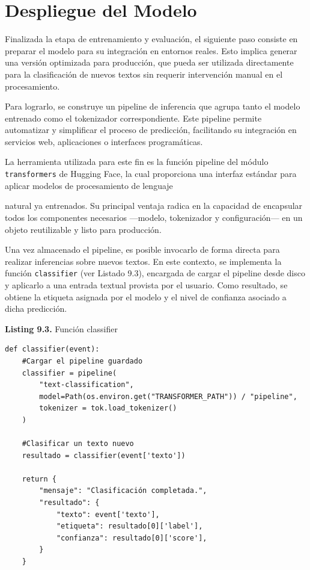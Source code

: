 \section{Despliegue del Modelo}

Finalizada la etapa de entrenamiento y evaluación, el siguiente paso consiste en preparar el modelo para su integración en entornos reales. Esto implica generar una versión optimizada para producción, que pueda ser utilizada directamente para la clasificación de nuevos textos sin requerir intervención manual en el procesamiento.

Para lograrlo, se construye un pipeline de inferencia que agrupa tanto el modelo entrenado como el tokenizador correspondiente. Este pipeline permite automatizar y simplificar el proceso de predicción, facilitando su integración en servicios web, aplicaciones o interfaces programáticas.

La herramienta utilizada para este fin es la función pipeline del módulo \texttt{transformers} de Hugging Face, la cual proporciona una interfaz estándar para aplicar modelos de procesamiento de lenguaje


\vspace{0.5cm}

natural ya entrenados. Su principal ventaja radica en la capacidad de encapsular todos los componentes necesarios —modelo, tokenizador y configuración— en un objeto reutilizable y listo para producción.

Una vez almacenado el pipeline, es posible invocarlo de forma directa para realizar inferencias sobre nuevos textos. En este contexto, se implementa la función \texttt{classifier} (ver Listado 9.3), encargada de cargar el pipeline desde disco y aplicarlo a una entrada textual provista por el usuario. Como resultado, se obtiene la etiqueta asignada por el modelo y el nivel de confianza asociado a dicha predicción.

\begin{center}
\textbf{Listing 9.3.} Función classifier
\end{center}

\begin{lstlisting}[style=pythoncode]
def classifier(event):
    #Cargar el pipeline guardado
    classifier = pipeline(
        "text-classification",
        model=Path(os.environ.get("TRANSFORMER_PATH")) / "pipeline",
        tokenizer = tok.load_tokenizer()
    )

    #Clasificar un texto nuevo
    resultado = classifier(event['texto'])

    return {
        "mensaje": "Clasificación completada.",
        "resultado": {
            "texto": event['texto'],
            "etiqueta": resultado[0]['label'],
            "confianza": resultado[0]['score'],
        }
    }
\end{lstlisting}

